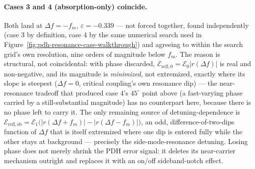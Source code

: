 \documentclass[9pt]{article}
\begin{document}
\paragraph{Cases 3 and 4 (absorption-only) coincide.} Both land at
$\Delta f=-f_m$, $\varepsilon=-0.339$ --- not forced together, found
independently (case 3 by definition, case 4 by the same numerical search
used in Figure~\ref{fig:pdh-resonance-case-walkthrough}) and agreeing to
within the search grid's own resolution, nine orders of magnitude below
$f_m$. The reason is structural, not coincidental: with phase discarded,
$\mathcal{E}_{\mathrm{refl},0}=\mathcal{E}_0|r(\Delta f)|$ is real and non-negative,
and its magnitude is \emph{minimized}, not extremized, exactly where its
slope is steepest ($\Delta f=0$, critical coupling's own resonance dip)
--- the near-resonance tradeoff that produced case 4's $45^\circ$ point
above (a fast-varying phase carried by a still-substantial magnitude) has
no counterpart here, because there is no phase left to carry it. The only
remaining source of detuning-dependence is
$\mathcal{E}_{\mathrm{refl,sb}}=\mathcal{E}_1\bigl(|r(\Delta f+f_m)|-|r(\Delta f-f_m)|\bigr)$,
an odd, difference-of-two-dips function of $\Delta f$ that is itself
extremized where one dip is entered fully while the other stays at
background --- precisely the side-mode-resonance detuning. Losing phase
does not merely shrink the PDH error signal: it deletes its near-carrier
mechanism outright and replaces it with an on/off sideband-notch effect.



\end{document}
